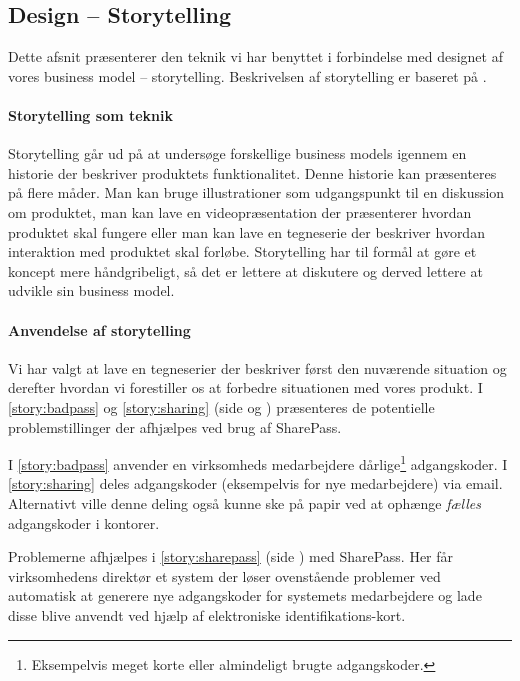 \subsection{Design -- Storytelling}
Dette afsnit præsenterer den teknik vi har benyttet i forbindelse med designet af vores business model -- storytelling.
Beskrivelsen af storytelling er baseret på \citet[p.~125]{osterwalder2009business}.

\paragraph{Storytelling som teknik}
Storytelling går ud på at undersøge forskellige business models igennem en historie der beskriver produktets funktionalitet.
Denne historie kan præsenteres på flere måder.
Man kan bruge illustrationer som udgangspunkt til en diskussion om produktet, man kan lave en videopræsentation der præsenterer hvordan produktet skal fungere eller man kan lave en tegneserie der beskriver hvordan interaktion med produktet skal forløbe.
Storytelling har til formål at gøre et koncept mere håndgribeligt, så det er lettere at diskutere og derved lettere at udvikle sin business model.

\paragraph{Anvendelse af storytelling}
Vi har valgt at lave en tegneserier der beskriver først den nuværende situation og derefter hvordan vi forestiller os at forbedre situationen med vores produkt.
I \cref{story:badpass} og \cref{story:sharing} (side \pageref{story:badpass} og \pageref{story:sharing}) præsenteres de potentielle problemstillinger der afhjælpes ved brug af SharePass.

I \cref{story:badpass} anvender en virksomheds medarbejdere dårlige\footnote{Eksempelvis meget korte eller almindeligt brugte adgangskoder.} adgangskoder.
I \cref{story:sharing} deles adgangskoder (eksempelvis for nye medarbejdere) via email.
Alternativt ville denne deling også kunne ske på papir ved at ophænge \emph{fælles} adgangskoder i kontorer.

Problemerne afhjælpes i \cref{story:sharepass} (side \pageref{story:sharepass}) med SharePass.
Her får virksomhedens direktør et system der løser ovenstående problemer ved automatisk at generere nye adgangskoder for systemets medarbejdere og lade disse blive anvendt ved hjælp af elektroniske identifikations-kort.

